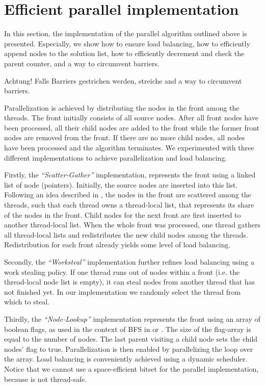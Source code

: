 \section{Efficient parallel implementation}\label{sec:yourmethod}
In this section, the implementation of the parallel algorithm outlined above is presented.
Especially, we show how to ensure load balancing, how to efficiently append nodes to the solution list, how to efficiently decrement and check the parent counter, and a way to circumvent barriers.
\begin{invisible}
 Achtung! Falls Barriers gestrichen werden, streiche and a way to circumvent barriers.
\end{invisible}

Parallelization is achieved by distributing the nodes in the front among the threads.
The front initially consists of all source nodes.
After all front nodes have been processed, all their child nodes are added to the front while the former front nodes are removed from the front.
If there are no more child nodes, all nodes have been processed and the algorithm terminates.
We experimented with three different implementations to achieve parallelization and load balancing.

Firstly, the \emph{``Scatter-Gather''} implementation, represents the front using a linked list of node (pointers). Initially, the source nodes are inserted into this list.
Following an idea described in \cite{bulucc2011parallel}, the nodes in the front are scattered among the threads, such that each thread owns a thread-local list,
that represents its share of the nodes in the front.
Child nodes for the next front are first inserted to another thread-local list.
When the whole front was processed, one thread gathers all thread-local lists and redistributes the new child nodes among the threads.
Redistribution for each front already yields some level of load balancing.

Secondly, the \emph{``Worksteal''} implementation further refines load balancing using a work stealing policy.
If one thread runs out of nodes within a front (i.e. the thread-local node list is empty), it can steal nodes from another thread that has not finished yet. In our implementation we randomly select the thread from which to steal.

Thirdly, the \emph{``Node-Lookup''} implementation represents the front using an array of boolean flags, as used in the context of BFS in \cite{agarwal2010scalable} or \cite{beamer2013direction}. The size of the flag-array is equal to the number of nodes.
The last parent visiting a child node sets the child nodes' flag to true. Parallelization is then enabled by parallelizing the loop over the array.
Load balancing is conveniently achieved using a dynamic scheduler.
Notice that we cannot use a space-efficient bitset for the parallel implementation, because is not thread-safe.


